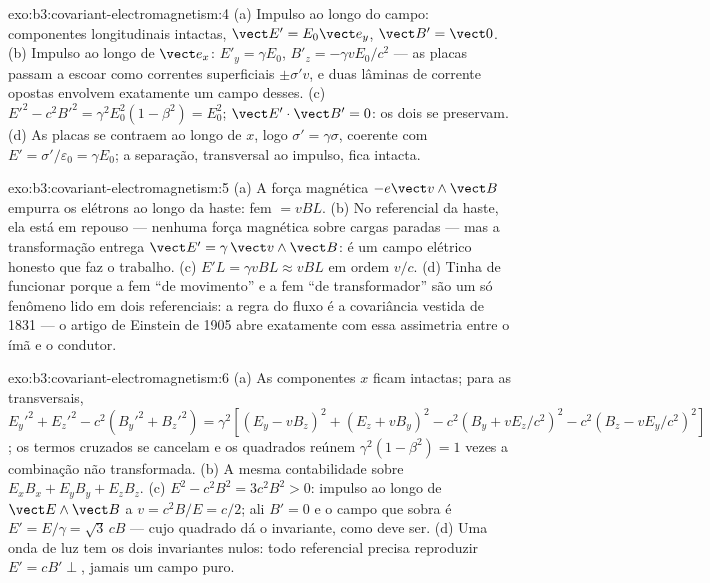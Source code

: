 \begin{solution}{exo:b3:covariant-electromagnetism:4}
(a) Impulso ao longo do campo: componentes longitudinais intactas, $\vect
E' = E_0\vect e_y$, $\vect B' = \vect 0$. (b) Impulso ao longo de $\vect
e_x$: $E'_y = \gamma E_0$, $B'_z = -\gamma vE_0/c^2$ --- as placas
passam a escoar como correntes superficiais $\pm\sigma'v$, e duas
lâminas de corrente opostas envolvem exatamente um campo desses. (c) $E'^2 - c^2B'^2 =
\gamma^2E_0^2(1 - \beta^2) = E_0^2$; $\vect E'\cdot\vect B' = 0$: os
dois se preservam. (d) As placas se contraem ao longo de $x$, logo $\sigma' =
\gamma\sigma$, coerente com $E' = \sigma'/\varepsilon_0 = \gamma
E_0$; a separação, transversal ao impulso, fica intacta.
\end{solution}

\begin{solution}{exo:b3:covariant-electromagnetism:5}
(a) A força magnética $-e\vect v\wedge\vect B$ empurra os elétrons ao
longo da haste: fem $= vBL$. (b) No referencial da haste, ela está em
repouso --- nenhuma força magnética sobre cargas paradas --- mas a
transformação entrega $\vect E' = \gamma\,\vect v\wedge\vect B$: é um
campo elétrico honesto que faz o trabalho. (c) $E'L = \gamma vBL
\approx vBL$ em ordem $v/c$. (d) Tinha de funcionar porque a fem ``de
movimento'' e a fem ``de transformador'' são um só fenômeno lido em
dois referenciais: a regra do fluxo é a covariância vestida de 1831 ---
o artigo de Einstein de 1905 abre exatamente com essa assimetria entre
o ímã e o condutor.
\end{solution}

\begin{solution}{exo:b3:covariant-electromagnetism:6}
(a) As componentes $x$ ficam intactas; para as transversais,
$E_y'^2 + E_z'^2 - c^2(B_y'^2 + B_z'^2) = \gamma^2[(E_y - vB_z)^2 +
(E_z + vB_y)^2 - c^2(B_y + vE_z/c^2)^2 - c^2(B_z - vE_y/c^2)^2]$;
os termos cruzados se cancelam e os quadrados reúnem $\gamma^2(1 -
\beta^2) = 1$ vezes a combinação não transformada. (b) A mesma
contabilidade sobre $E_xB_x + E_yB_y + E_zB_z$. (c) $E^2 - c^2B^2 =
3c^2B^2 > 0$: impulso ao longo de $\vect E\wedge\vect B$ a $v = c^2B/E =
c/2$; ali $B' = 0$ e o campo que sobra é $E' = E/\gamma =
\sqrt3\,cB$ --- cujo quadrado dá o invariante, como deve ser. (d) Uma onda de luz tem os dois invariantes
nulos: todo referencial precisa reproduzir $E' = cB' \perp$, jamais um campo puro.
\end{solution}

